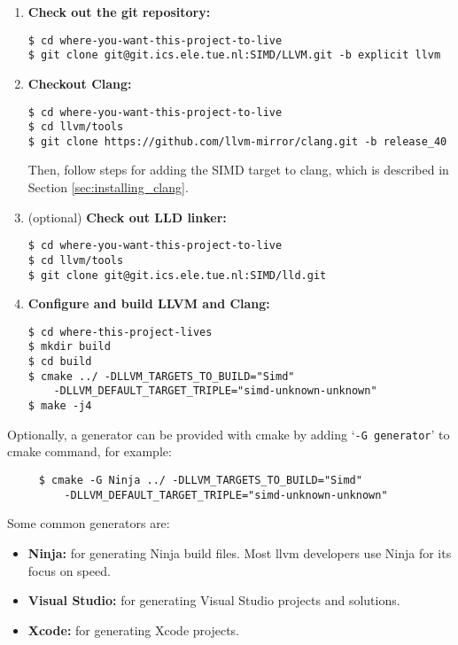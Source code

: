 \lstset{style=customasm}
\begin{enumerate}
\item \textbf{Check out the git repository:}
\begin{lstlisting}
$ cd where-you-want-this-project-to-live
$ git clone git@git.ics.ele.tue.nl:SIMD/LLVM.git -b explicit llvm
\end{lstlisting}
\item \textbf{Checkout Clang:}
\begin{lstlisting}
$ cd where-you-want-this-project-to-live
$ cd llvm/tools
$ git clone https://github.com/llvm-mirror/clang.git -b release_40
\end{lstlisting}
Then, follow steps for adding the SIMD target to clang, which is described in Section \ref{sec:installing_clang}.

\item (optional) \textbf{Check out LLD linker:}
\begin{lstlisting}
$ cd where-you-want-this-project-to-live
$ cd llvm/tools
$ git clone git@git.ics.ele.tue.nl:SIMD/lld.git
\end{lstlisting}

\item \textbf{Configure and build LLVM and Clang:}
\begin{lstlisting}
$ cd where-this-project-lives
$ mkdir build
$ cd build
$ cmake ../ -DLLVM_TARGETS_TO_BUILD="Simd" 
    -DLLVM_DEFAULT_TARGET_TRIPLE="simd-unknown-unknown"
$ make -j4
\end{lstlisting}

\end{enumerate}
	
Optionally, a generator can be provided with cmake by adding `\texttt{-G generator}' to cmake command, for example:
\begin{lstlisting}
     $ cmake -G Ninja ../ -DLLVM_TARGETS_TO_BUILD="Simd"
         -DLLVM_DEFAULT_TARGET_TRIPLE="simd-unknown-unknown"
\end{lstlisting}

Some common generators are:
\begin{itemize}
	\item \textbf{Ninja:} for generating Ninja build files. Most llvm developers use Ninja for its focus on speed.
	\item \textbf{Visual Studio:} for generating Visual Studio projects and solutions.
	\item \textbf{Xcode:} for generating Xcode projects.
\end{itemize}

